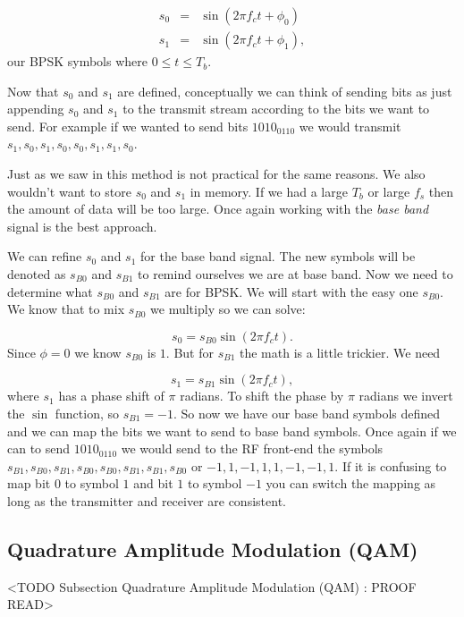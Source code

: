 \begin{eqnarray}
s_0 &=& \sin\left(2\pi f_ct + \phi_0\right)\\
s_1 &=& \sin\left(2\pi f_ct + \phi_1\right),
\end{eqnarray}
\noindent
our \ac{BPSK} symbols where $0 \leq t \leq T_b$.

Now that $s_0$ and $s_1$ are defined, conceptually we can think of sending bits as just appending $s_0$ and $s_1$ to the transmit stream according to the bits we want to send. For example if we wanted to send bits $1010_0110$ we would transmit $s_1, s_0, s_1, s_0, s_0, s_1, s_1, s_0$.

Just as we saw in  this method is not practical for the same reasons. We also wouldn't want to store $s_0$ and $s_1$ in memory. If we had a large $T_b$ or large $f_s$ then the amount of data will be too large. Once again working with the \emph{base band} signal is the best approach.

We can refine $s_0$ and $s_1$ for the base band signal. The new symbols will be denoted as $s_{B0}$ and $s_{B1}$ to remind ourselves we are at base band. Now we need to determine what $s_{B0}$ and $s_{B1}$ are for \ac{BPSK}. We will start with the easy one $s_{B0}$. We know that to mix $s_{B0}$ we multiply so we can solve:

\begin{equation}
s_0 = s_{B0}\sin\left(2\pi f_ct\right).
\end{equation}
\noindent
Since $\phi=0$ we know $s_{B0}$ is $1$. But for $s_{B1}$ the math is a little trickier. We need

\begin{equation}
s_1 = s_{B1}\sin\left(2\pi f_ct\right),
\end{equation}
\noindent
where $s_1$ has a phase shift of $\pi$ radians. To shift the phase by $\pi$ radians we invert the $\sin$ function, so $s_{B1}=-1$. So now we have our base band symbols defined and we can map the bits we want to send to base band symbols. Once again if we can to send $1010_0110$ we would send to the \ac{RF} front-end the symbols  $s_{B1}, s_{B0}, s_{B1}, s_{B0}, s_{B0}, s_{B1}, s_{B1}, s_{B0}$ or $-1,1,-1,1,1,-1,-1,1$. If it is confusing to map bit $0$ to symbol $1$ and bit $1$ to symbol $-1$ you can switch the mapping as long as the transmitter and receiver are consistent.
	
\subsection{Quadrature Amplitude Modulation (QAM)}
	<TODO Subsection Quadrature Amplitude Modulation (QAM) : PROOF READ>

